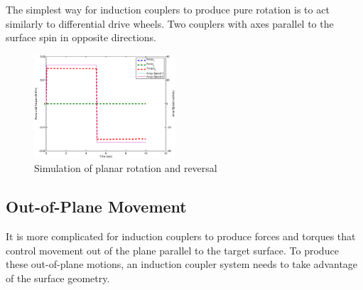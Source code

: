 \documentclass[letterpaper, 10 pt, conference]{ieeeconf}  %
\begin{document}
The simplest way for induction couplers to produce pure rotation is to act similarly to differential drive wheels. Two couplers with axes parallel to the surface spin in opposite directions.

      \begin{figure}[thpb]
      \centering
      \includegraphics[width = 0.47\textwidth]{figures/planar_rotations.eps}
      \caption{Simulation of planar rotation and reversal}
      \label{fig:planarrotation}
   \end{figure}


\subsection{Out-of-Plane Movement}

It is more complicated for induction couplers to produce forces and torques that control movement out of the plane parallel to the target surface. To produce these out-of-plane motions, an induction coupler system needs to take advantage of the surface geometry.
 
\end{document}
